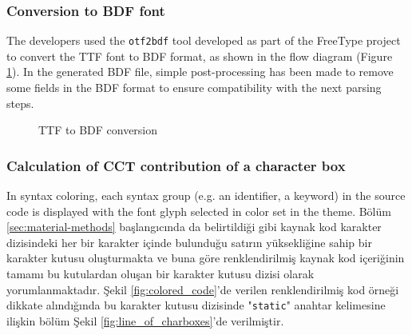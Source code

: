 \documentclass{article}
\begin{document}
\subsubsection{Conversion to BDF font}

The developers used the \texttt{otf2bdf} tool\cite{otf2bdf2008man} developed as part of the FreeType project\cite{freetype2022project} to convert the TTF font to BDF format, as shown in the flow diagram (Figure \ref{fig:otf2bdf}). In the generated BDF file, simple post-processing has been made to remove some fields in the BDF format to ensure compatibility with the next parsing steps.

\begin{figure}[H]
  \caption{TTF to BDF conversion}
  \label{fig:otf2bdf}

\end{figure}

\subsubsection{Calculation of CCT contribution of a character box}

In syntax coloring, each syntax group (e.g. an identifier, a keyword) in the source code is displayed with the font
glyph selected in color set in the theme. Bölüm \ref{sec:material-methods} başlangıcında da belirtildiği gibi kaynak kod
karakter dizisindeki her bir karakter içinde bulunduğu satırın yüksekliğine sahip bir karakter kutusu oluşturmakta ve
buna göre renklendirilmiş kaynak kod içeriğinin tamamı bu kutulardan oluşan bir karakter kutusu dizisi olarak
yorumlanmaktadır. Şekil \ref{fig:colored_code}'de verilen renklendirilmiş kod örneği dikkate alındığında bu karakter
kutusu dizisinde "\texttt{static}" anahtar kelimesine ilişkin bölüm Şekil \ref{fig:line_of_charboxes}'de verilmiştir.
\end{document}
